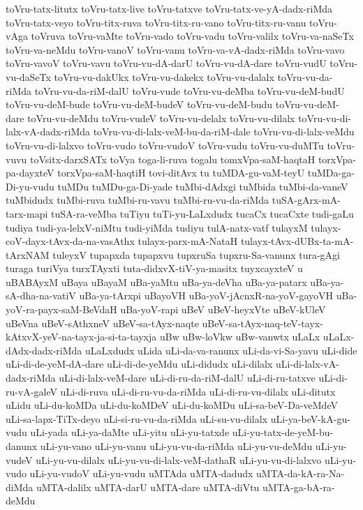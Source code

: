 {toVru-tatx-litutx
toVru-tatx-live
toVru-tatxve
toVru-tatx-ve-yA-dadx-riMda
toVru-tatx-veyo
toVru-titx-ruva
toVru-titx-ru-vano
toVru-titx-ru-vanu
toVru-vAga
toVruva
toVru-vaMte
toVru-vado
toVru-vadu
toVru-valilx
toVru-va-naSeTx
toVru-va-neMdu
toVru-vanoV
toVru-vanu
toVru-va-vA-dadx-riMda
toVru-vavo
toVru-vavoV
toVru-vavu
toVru-vu-dA-darU
toVru-vu-dA-dare
toVru-vudU
toVru-vu-daSeTx
toVru-vu-dakUkx
toVru-vu-dakekx
toVru-vu-dalalx
toVru-vu-da-riMda
toVru-vu-da-riM-dalU
toVru-vude
toVru-vu-deMba
toVru-vu-deM-budU
toVru-vu-deM-bude
toVru-vu-deM-budeV
toVru-vu-deM-budu
toVru-vu-deM-dare
toVru-vu-deMdu
toVru-vudeV
toVru-vu-delalx
toVru-vu-dilalx
toVru-vu-di-lalx-vA-dadx-riMda
toVru-vu-di-lalx-veM-bu-da-riM-dale
toVru-vu-di-lalx-veMdu
toVru-vu-di-lalxvo
toVru-vudo
toVru-vudoV
toVru-vudu
toVru-vu-duMTu
toVru-vuvu
toVsitx-darxSATx
toVya
toga-li-ruva
togalu
tomxVpa-saM-haqtaH
torxVpa-pa-dayxteV
torxVpa-saM-haqtiH
tovi-ditAvx
tu
tuMDA-gu-vaM-teyU
tuMDa-ga-Di-yu-vudu
tuMDu
tuMDu-ga-Di-yade
tuMbi-dAdxgi
tuMbida
tuMbi-da-vaneV
tuMbidudx
tuMbi-ruva
tuMbi-ru-vavu
tuMbi-ru-vu-da-riMda
tuSA-gArx-mA-tarx-mapi
tuSA-ra-veMba
tuTiyu
tuTi-yu-LaLxdudx
tucaCx
tucaCxte
tudi-gaLu
tudiya
tudi-ya-lelxV-niMtu
tudi-yiMda
tudiyu
tulA-natx-vatf
tulayxM
tulayx-coV-dayx-tAvx-da-na-vasAthx
tulayx-parx-mA-NataH
tulayx-tAvx-dUBx-ta-mA-tArxNAM
tuleyxV
tupapxda
tupapxvu
tupxruSa
tupxru-Sa-vanunx
tura-gAgi
turaga
turiVya
turxTAyxti
tuta-didxvX-tiV-ya-masitx
tuyxcayxteV
u
uBABAyxM
uBaya
uBayaM
uBa-yaMtu
uBa-ya-deVha
uBa-ya-patarx
uBa-ya-sA-dha-na-vatiV
uBa-ya-tArxpi
uBayoVH
uBa-yoV-jAcnxR-na-yoV-gayoVH
uBa-yoV-ra-payx-saM-BeVdaH
uBa-yoV-rapi
uBeV
uBeV-heyxVte
uBeV-kUleV
uBeVna
uBeV-sAthxneV
uBeV-sa-tAyx-naqte
uBeV-sa-tAyx-naq-teV-tayx-kAtxvX-yeV-na-tayx-ja-si-ta-tayxja
uBw
uBw-loVkw
uBw-vanwtx
uLaLx
uLaLx-dAdx-dadx-riMda
uLaLxdudx
uLida
uLi-da-va-ranunx
uLi-da-vi-Sa-yavu
uLi-dide
uLi-di-de-yeM-dA-dare
uLi-di-de-yeMdu
uLi-didudx
uLi-dilalx
uLi-di-lalx-vA-dadx-riMda
uLi-di-lalx-veM-dare
uLi-di-ru-da-riM-dalU
uLi-di-ru-tatxve
uLi-di-ru-vA-galeV
uLi-di-ruva
uLi-di-ru-vu-da-riMda
uLi-di-ru-vu-dilalx
uLi-ditutx
uLidu
uLi-du-koMDa
uLi-du-koMDeV
uLi-du-koMDu
uLi-sa-beV-Da-veMdeV
uLi-sa-lapx-TiTx-deyo
uLi-si-ru-vu-da-riMda
uLi-su-vu-dilalx
uLi-ya-beV-kA-gu-vudu
uLi-yada
uLi-ya-daMte
uLi-yitu
uLi-yu-tatxde
uLi-yu-tatx-de-yeM-bu-danunx
uLi-yu-vano
uLi-yu-vanu
uLi-yu-vu-da-riMda
uLi-yu-vu-deMdu
uLi-yu-vudeV
uLi-yu-vu-dilalx
uLi-yu-vu-di-lalx-veM-dathaR
uLi-yu-vu-di-lalxvo
uLi-yu-vudo
uLi-yu-vudoV
uLi-yu-vudu
uMTAda
uMTA-dadudx
uMTA-da-kA-ra-Na-diMda
uMTA-dalilx
uMTA-darU
uMTA-dare
uMTA-diVtu
uMTA-ga-bA-ra-deMdu
}
